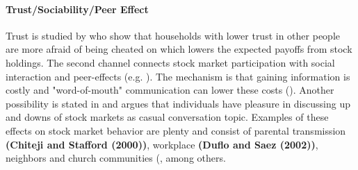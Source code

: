 \documentclass[ProjectABM]{subfiles}
\begin{document}





\paragraph{Trust/Sociability/Peer Effect}
Trust is studied by \cite{guiso_et_al_2008trusting} who show that households with lower trust in other people are more afraid of being cheated on which lowers the expected payoffs from stock holdings.
The second channel connects stock market participation with social interaction and peer-effects (e.g. \cite{georgarakos_pasini_2011, brown_2008, hong_et_al_2004social}). The mechanism is that gaining information is costly and "word-of-mouth" communication can lower these costs (\cite{brown_2008}). Another possibility is stated in \cite{hong_et_al_2004social} and argues that individuals have pleasure in discussing up and downs of stock markets as casual conversation topic. Examples of these effects on stock market behavior are plenty and consist of parental transmission \textbf{(Chiteji and Stafford (2000))}, workplace \textbf{(Duflo and Saez (2002))}, neighbors and church communities (\cite{hong_et_al_2004social, brown_2008}, among others.
\end{document}
